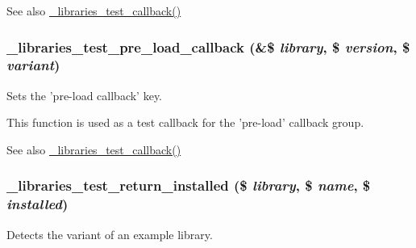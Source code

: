 \begin{DoxySeeAlso}{See also}
\hyperlink{libraries__test_8module_a4ecb0be495ba6a434403bc89961cbb8d}{\_\-libraries\_\-test\_\-callback()} 
\end{DoxySeeAlso}
\hypertarget{libraries__test_8module_a30b3f98d4f5f93bafd1e901d4b55ee84}{
\subsubsection[{\_\-libraries\_\-test\_\-pre\_\-load\_\-callback}]{\setlength{\rightskip}{0pt plus 5cm}\_\-libraries\_\-test\_\-pre\_\-load\_\-callback (\&\$ {\em library}, \/  \$ {\em version}, \/  \$ {\em variant})}}
\label{libraries__test_8module_a30b3f98d4f5f93bafd1e901d4b55ee84}
Sets the 'pre-\/load callback' key.

This function is used as a test callback for the 'pre-\/load' callback group.

\begin{DoxySeeAlso}{See also}
\hyperlink{libraries__test_8module_a4ecb0be495ba6a434403bc89961cbb8d}{\_\-libraries\_\-test\_\-callback()} 
\end{DoxySeeAlso}
\hypertarget{libraries__test_8module_aa90217dd3a963d0d60b2f9c96c80813e}{
\subsubsection[{\_\-libraries\_\-test\_\-return\_\-installed}]{\setlength{\rightskip}{0pt plus 5cm}\_\-libraries\_\-test\_\-return\_\-installed (\$ {\em library}, \/  \$ {\em name}, \/  \$ {\em installed})}}
\label{libraries__test_8module_aa90217dd3a963d0d60b2f9c96c80813e}
Detects the variant of an example library.


